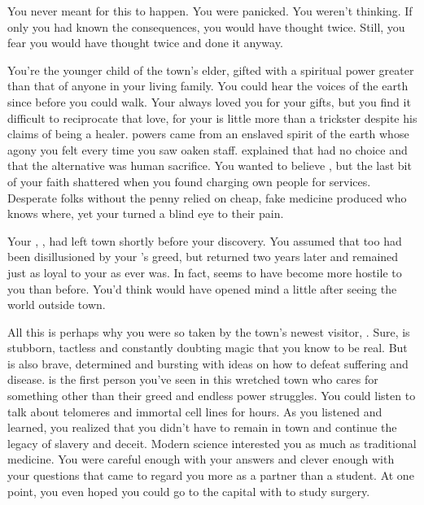\documentclass[char]{Pestilence}
\begin{document}
\name{\cRebel{}}

You never meant for this to happen. You were panicked. You weren't thinking. If only you had known the consequences, you would have thought twice. Still, you fear you would have thought twice and done it anyway.

You're the younger child of the town's elder, gifted with a spiritual power greater than that of anyone in your living family. You could hear the voices of the earth since before you could walk. Your \cElder{\parent} always loved you for your gifts, but you find it difficult to reciprocate that love, for your \cElder{\parent} is little more than a trickster despite his claims of being a healer. \cElder{\Their} powers came from an enslaved spirit of the earth whose agony you felt every time you saw \cElder{\their} oaken staff. \cElder{\They} explained that \cElder{\they} had no choice and that the alternative was human sacrifice. You wanted to believe \cElder{\them}, but the last bit of your faith shattered when you found \cElder{\them} charging \cElder{\their} own people for \cElder{\their} services. Desperate folks without the penny relied on cheap, fake medicine produced who knows where, yet your \cElder{\parent} turned a blind eye to their pain.

Your \cApprentice{\sibling}, \cApprentice{}, had left town shortly before your discovery. You assumed that \cApprentice{\they} too had been disillusioned by your \cElder{\parent}'s greed, but \cApprentice{\they} returned two years later and remained just as loyal to your \cElder{\parent} as \cApprentice{\they} ever was. In fact, \cApprentice{\they} seems to have become more hostile to you than before. You'd think \cApprentice{} would have opened \cApprentice{\their} mind a little after seeing the world outside town.   

All this is perhaps why you were so taken by the town's newest visitor, \cOutsider{\intro}. Sure, \cOutsider{\they} is stubborn, tactless and constantly doubting magic that you know to be real. But \cOutsider{\they} is also brave, determined and bursting with ideas on how to defeat suffering and disease. \cOutsider{\They} is the first person you've seen in this wretched town who cares for something other than their greed and endless power struggles. You could listen to \cOutsider{\them} talk about telomeres and immortal cell lines for hours. As you listened and learned, you realized that you didn't have to remain in town and continue the legacy of slavery and deceit. Modern science interested you as much as traditional medicine. You were careful enough with your answers and clever enough with your questions that \cOutsider{} came to regard you more as a partner than a student. At one point, you even hoped you could go to the capital with \cOutsider{\them} to study surgery.
\end{document}
